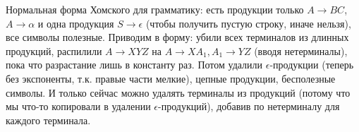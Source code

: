 	Нормальная форма Хомского для грамматику: есть продукции только $A\to BC$, $A\to \alpha$ и одна продукция $S\to\epsilon$
	(чтобы получить пустую строку, иначе нельзя), все символы полезные.
	Приводим в форму: убили всех терминалов из длинных продукций,
	распилили $A \to XYZ$ на $A\to XA_1, A_1\to YZ$ (вводя нетерминалы), пока что разрастание лишь в константу раз.
	Потом удалили $\epsilon$-продукции (теперь без экспоненты, т.к. правые части мелкие), цепные продукции, бесполезные символы.
	И только сейчас можно удалять терминалы из продукций (потому что мы что-то копировали в удалении $\epsilon$-продукций),
	добавив по нетерминалу для каждого терминала.

\section{} %
	\TODO
